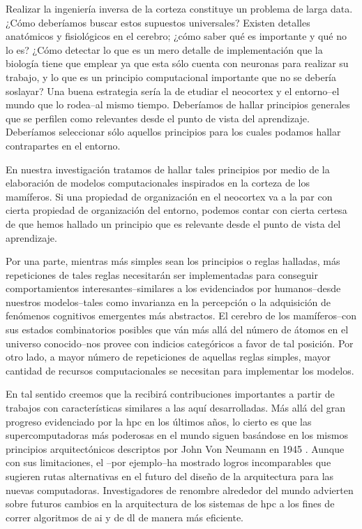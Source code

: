 Realizar la ingeniería inversa de la corteza constituye un problema de larga data.
¿Cómo deberíamos buscar estos supuestos universales?
Existen detalles anatómicos y fisiológicos en el cerebro; ¿cómo saber qué es importante y qué no lo es?
¿Cómo detectar lo que es un mero detalle de implementación que la biología tiene que emplear ya que esta sólo cuenta con neuronas
para realizar su trabajo, y lo que es un principio computacional importante que no se debería soslayar?
Una buena estrategia sería la de etudiar el neocortex y el entorno--el mundo que lo rodea--al mismo tiempo.
Deberíamos de hallar principios generales que se perfilen como relevantes desde el punto de vista del aprendizaje.
Deberíamos seleccionar sólo aquellos principios para los cuales podamos hallar contrapartes en el entorno.

En nuestra investigación tratamos de hallar tales principios por medio de la elaboración de modelos computacionales inspirados en la corteza de los mamíferos.
Si una propiedad de organización en el neocortex va a la par con cierta propiedad de organización del entorno, podemos contar con cierta certesa
de que hemos hallado un principio que es relevante desde el punto de vista del aprendizaje.

Por una parte, mientras más simples sean los principios o reglas halladas, más repeticiones de tales reglas necesitarán ser implementadas
para conseguir comportamientos interesantes--similares a los evidenciados por humanos--desde nuestros modelos--tales como invarianza en la percepción o la adquisición de fenómenos cognitivos emergentes más abstractos.
El cerebro de los mamíferos--con sus estados combinatorios posibles que ván más allá del número de átomos en
el universo conocido--nos provee con indicios categóricos a favor de tal posición.
Por otro lado, a mayor número de repeticiones de aquellas reglas simples, mayor cantidad de recursos computacionales
se necesitan para implementar los modelos.



En tal sentido creemos que la   recibirá contribuciones importantes a partir de trabajos con características similares a las aquí desarrolladas.
Más allá del gran progreso evidenciado por la \gls{hpc} en los últimos años, lo cierto es que las supercomputadoras más poderosas en el mundo
siguen basándose en los mismos principios arquitectónicos descriptos por John Von Neumann en 1945 \cite{10.1109/85.238389}.
Aunque con sus limitaciones, el --por ejemplo--ha mostrado logros incomparables
que sugieren rutas alternativas en el futuro del diseño de la arquitectura para las nuevas computadoras.
Investigadores de renombre alrededor del mundo advierten sobre futuros cambios en la arquitectura de los
sistemas de \gls{hpc} a los fines de correr algoritmos de \gls{ai} y de \gls{dl} de manera más eficiente.

